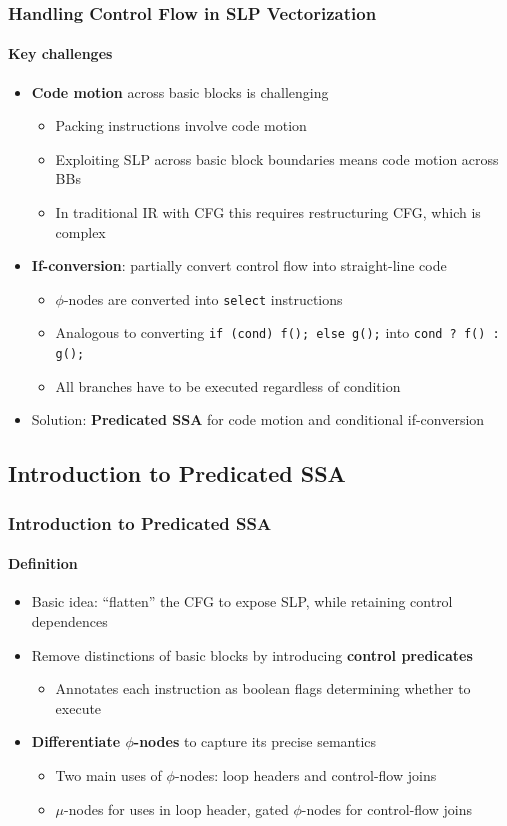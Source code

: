 \documentclass[aspectratio=169]{beamer}
\begin{document}
\begin{frame}
  \frametitle{Handling Control Flow in SLP Vectorization}
  \framesubtitle{Key challenges}

  \begin{itemize}
    \item {\bfseries Code motion} across basic blocks is challenging
    \begin{itemize}
      \item Packing instructions involve code motion
      \item Exploiting SLP across basic block boundaries means code motion across BBs
      \item In traditional IR with CFG this requires restructuring CFG, which is complex
    \end{itemize}
    \item {\bfseries If-conversion}: partially convert control flow into straight-line code
    \begin{itemize}
      \item \(\phi\)-nodes are converted into \texttt{select} instructions
      \item Analogous to converting \texttt{if (cond) f(); else g();} into \texttt{cond ? f() : g();}
      \item All branches have to be executed regardless of condition
    \end{itemize}
    \pause
    \item Solution: {\bfseries Predicated SSA} for code motion and conditional if-conversion
  \end{itemize}
\end{frame}

\subsection{Introduction to Predicated SSA}
\begin{frame}
  \frametitle{Introduction to Predicated SSA}
  \framesubtitle{Definition}

  \begin{itemize}
    \item Basic idea: ``flatten'' the CFG to expose SLP, while retaining control dependences
    \pause
    \item Remove distinctions of basic blocks by introducing {\bfseries control predicates}
    \begin{itemize}
      \item Annotates each instruction as boolean flags determining whether to execute
    \end{itemize}
    \pause
    \item {\bfseries Differentiate \(\phi\)-nodes} to capture its precise semantics
    \begin{itemize}
      \item Two main uses of \(\phi\)-nodes: loop headers and control-flow joins
      \item \(\mu\)-nodes for uses in loop header, gated \(\phi\)-nodes for control-flow joins
    \end{itemize}
  \end{itemize}
\end{frame}
\end{document}
